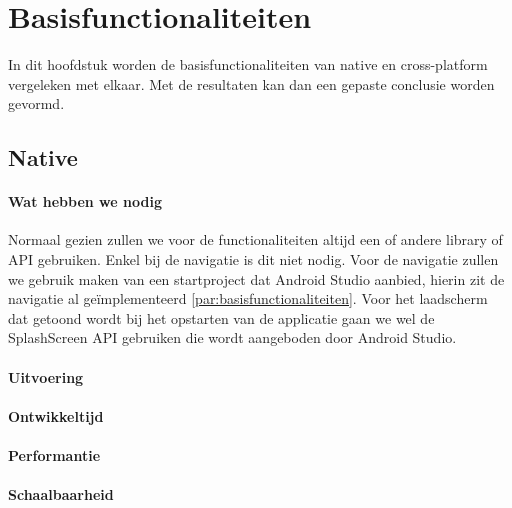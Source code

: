 
\chapter{Basisfunctionaliteiten}%
\label{ch:basisfunctionaliteiten}

In dit hoofdstuk worden de basisfunctionaliteiten van native en cross-platform vergeleken met elkaar. 
Met de resultaten kan dan een gepaste conclusie worden gevormd.

\section{Native}
\subsubsection{Wat hebben we nodig}
Normaal gezien zullen we voor de functionaliteiten altijd een of andere library of API gebruiken. 
Enkel bij de navigatie is dit niet nodig. Voor de navigatie zullen we gebruik maken van een 
startproject dat Android Studio aanbied, hierin zit de navigatie al geïmplementeerd 
\ref{par:basisfunctionaliteiten}. Voor het laadscherm dat getoond wordt bij het opstarten van 
de applicatie gaan we wel de SplashScreen API gebruiken die wordt aangeboden door Android Studio.

\subsubsection{Uitvoering}



\subsubsection{Ontwikkeltijd}



\subsubsection{Performantie}



\subsubsection{Schaalbaarheid}

